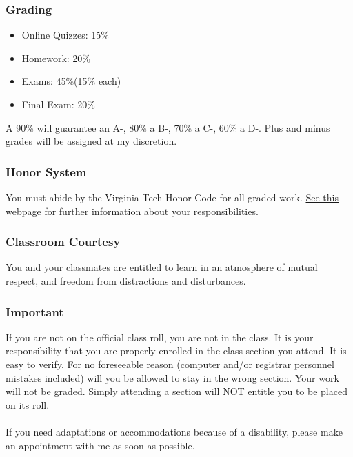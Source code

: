 \documentclass{article}
\begin{document}
		\subsubsection*{Grading} 
			\begin{itemize}
				\item  Online Quizzes:	15\% 
				\item  Homework:	20\%
				\item  Exams:	45\%(15\% each) 
				\item  Final Exam:	20\%
			\end{itemize}
			A 90\% will guarantee an A-, 80\% a B-, 70\% a C-, 60\% a D-. Plus and
			minus grades will be assigned at my discretion.
      
		\subsubsection*{Honor System} 
				You must abide by the Virginia Tech Honor Code for all graded work.
				\href{http://www.emporium.vt.edu/math1205/resources/honorpolicy.html}{See
				this webpage} for further information about your responsibilities.
      
		\subsubsection*{Classroom Courtesy} 
			You and your classmates are entitled to learn in an atmosphere of mutual
			respect, and freedom from distractions and disturbances.  
		 
		\subsubsection*{Important} 
			If you are not on the official class roll, you are not in the class.  It
			is your responsibility that you are properly enrolled in the class section
			you attend.  It is easy to verify.  For no foreseeable reason (computer
			and/or registrar personnel mistakes included) will you be allowed to stay
			in the wrong section.  Your work will not be graded.  Simply attending a
			section will NOT entitle you to be placed on its roll.\\ 
          \\ 
			If you need adaptations or accommodations because of a disability, please
			make an appointment with me as soon as possible.
     
\end{document}
